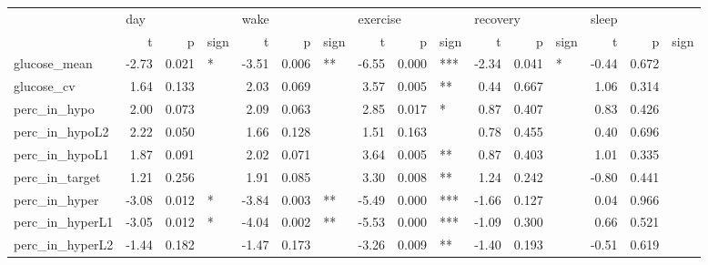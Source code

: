 \begin{tabular}{lrrlrrlrrlrrlrrl}
\toprule
{} & \multicolumn{3}{l}{day} & \multicolumn{3}{l}{wake} & \multicolumn{3}{l}{exercise} & \multicolumn{3}{l}{recovery} & \multicolumn{3}{l}{sleep} \\
{} &     t &      p & sign &     t &      p & sign &        t &      p & sign &        t &      p & sign &     t &      p & sign \\
\midrule
glucose_mean    & -2.73 &  0.021 &    * & -3.51 &  0.006 &   ** &    -6.55 &  0.000 &  *** &    -2.34 &  0.041 &    * & -0.44 &  0.672 &      \\
glucose_cv      &  1.64 &  0.133 &      &  2.03 &  0.069 &      &     3.57 &  0.005 &   ** &     0.44 &  0.667 &      &  1.06 &  0.314 &      \\
perc_in_hypo    &  2.00 &  0.073 &      &  2.09 &  0.063 &      &     2.85 &  0.017 &    * &     0.87 &  0.407 &      &  0.83 &  0.426 &      \\
perc_in_hypoL2  &  2.22 &  0.050 &      &  1.66 &  0.128 &      &     1.51 &  0.163 &      &     0.78 &  0.455 &      &  0.40 &  0.696 &      \\
perc_in_hypoL1  &  1.87 &  0.091 &      &  2.02 &  0.071 &      &     3.64 &  0.005 &   ** &     0.87 &  0.403 &      &  1.01 &  0.335 &      \\
perc_in_target  &  1.21 &  0.256 &      &  1.91 &  0.085 &      &     3.30 &  0.008 &   ** &     1.24 &  0.242 &      & -0.80 &  0.441 &      \\
perc_in_hyper   & -3.08 &  0.012 &    * & -3.84 &  0.003 &   ** &    -5.49 &  0.000 &  *** &    -1.66 &  0.127 &      &  0.04 &  0.966 &      \\
perc_in_hyperL1 & -3.05 &  0.012 &    * & -4.04 &  0.002 &   ** &    -5.53 &  0.000 &  *** &    -1.09 &  0.300 &      &  0.66 &  0.521 &      \\
perc_in_hyperL2 & -1.44 &  0.182 &      & -1.47 &  0.173 &      &    -3.26 &  0.009 &   ** &    -1.40 &  0.193 &      & -0.51 &  0.619 &      \\
\bottomrule
\end{tabular}
